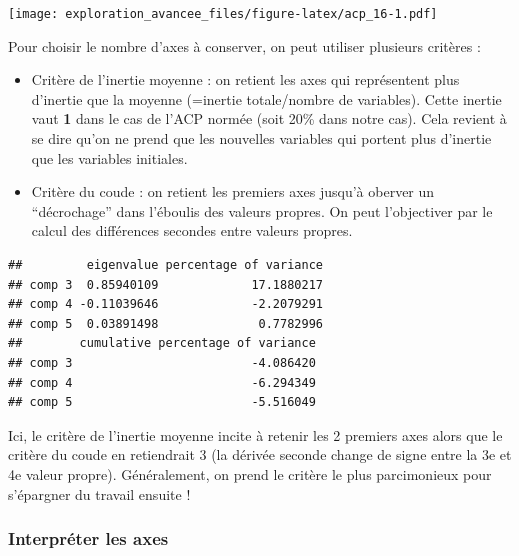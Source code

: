 \documentclass[]{book}
\newenvironment{Shaded}{\begin{snugshade}}{\end{snugshade}}
\newcommand{\KeywordTok}[1]{\textcolor[rgb]{0.13,0.29,0.53}{\textbf{#1}}}
\newcommand{\NormalTok}[1]{#1}
\newcommand{\OperatorTok}[1]{\textcolor[rgb]{0.81,0.36,0.00}{\textbf{#1}}}
\newcommand{\StringTok}[1]{\textcolor[rgb]{0.31,0.60,0.02}{#1}}
\providecommand{\tightlist}{%
  \setlength{\itemsep}{0pt}\setlength{\parskip}{0pt}}
\begin{document}
\texttt{[image: exploration\_avancee\_files/figure-latex/acp\_16-1.pdf]}

Pour choisir le nombre d'axes à conserver, on peut utiliser plusieurs critères :

\begin{itemize}
\tightlist
\item
  Critère de l'inertie moyenne : on retient les axes qui représentent plus d'inertie que la moyenne (=inertie totale/nombre de variables). Cette inertie vaut \textbf{1} dans le cas de l'ACP normée (soit 20\% dans notre cas). Cela revient à se dire qu'on ne prend que les nouvelles variables qui portent plus d'inertie que les variables initiales.
\item
  Critère du coude : on retient les premiers axes jusqu'à oberver un ``décrochage'' dans l'éboulis des valeurs propres. On peut l'objectiver par le calcul des différences secondes entre valeurs propres.
\end{itemize}

\begin{Shaded}
\end{Shaded}

\begin{verbatim}
##         eigenvalue percentage of variance
## comp 3  0.85940109             17.1880217
## comp 4 -0.11039646             -2.2079291
## comp 5  0.03891498              0.7782996
##        cumulative percentage of variance
## comp 3                         -4.086420
## comp 4                         -6.294349
## comp 5                         -5.516049
\end{verbatim}

Ici, le critère de l'inertie moyenne incite à retenir les 2 premiers axes alors que le critère du coude en retiendrait 3 (la dérivée seconde change de signe entre la 3e et 4e valeur propre). Généralement, on prend le critère le plus parcimonieux pour s'épargner du travail ensuite !

\hypertarget{interpreter-les-axes}{%
\subsubsection{Interpréter les axes}\label{interpreter-les-axes}}
\end{document}
